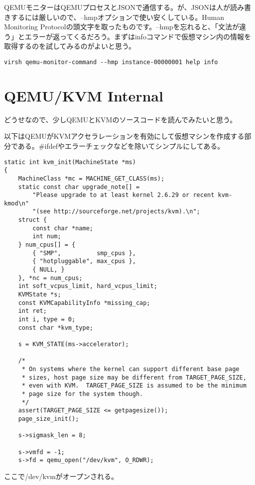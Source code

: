 \documentclass[9pt,b5paper,tombo]{jsbook}
\begin{document}
QEMUモニターはQEMUプロセスとJSONで通信する。が、JSONは人が読み書きするには厳しいので、--hmpオプションで使い安くしている。Human Monitoring Protocolの頭文字を取ったものです。--hmpを忘れると、「文法が違う」とエラーが返ってくるだろう。まずはinfoコマンドで仮想マシン内の情報を取得するのを試してみるのがよいと思う。

\begin{lstlisting}
virsh qemu-monitor-command --hmp instance-00000001 help info
\end{lstlisting}

\section{QEMU/KVM Internal}

どうせなので、少しQEMUとKVMのソースコードを読んでみたいと思う。

以下はQEMUがKVMアクセラレーションを有効にして仮想マシンを作成する部分である。\#ifdefやエラーチェックなどを除いてシンプルにしてある。

\begin{lstlisting}
static int kvm_init(MachineState *ms)
{
    MachineClass *mc = MACHINE_GET_CLASS(ms);
    static const char upgrade_note[] =
        "Please upgrade to at least kernel 2.6.29 or recent kvm-kmod\n"
        "(see http://sourceforge.net/projects/kvm).\n";
    struct {
        const char *name;
        int num;
    } num_cpus[] = {
        { "SMP",          smp_cpus },
        { "hotpluggable", max_cpus },
        { NULL, }
    }, *nc = num_cpus;
    int soft_vcpus_limit, hard_vcpus_limit;
    KVMState *s;
    const KVMCapabilityInfo *missing_cap;
    int ret;
    int i, type = 0;
    const char *kvm_type;

    s = KVM_STATE(ms->accelerator);

    /*
     * On systems where the kernel can support different base page
     * sizes, host page size may be different from TARGET_PAGE_SIZE,
     * even with KVM.  TARGET_PAGE_SIZE is assumed to be the minimum
     * page size for the system though.
     */
    assert(TARGET_PAGE_SIZE <= getpagesize());
    page_size_init();

    s->sigmask_len = 8;

    s->vmfd = -1;
    s->fd = qemu_open("/dev/kvm", O_RDWR);
\end{lstlisting}

ここで/dev/kvmがオープンされる。
\end{document}
